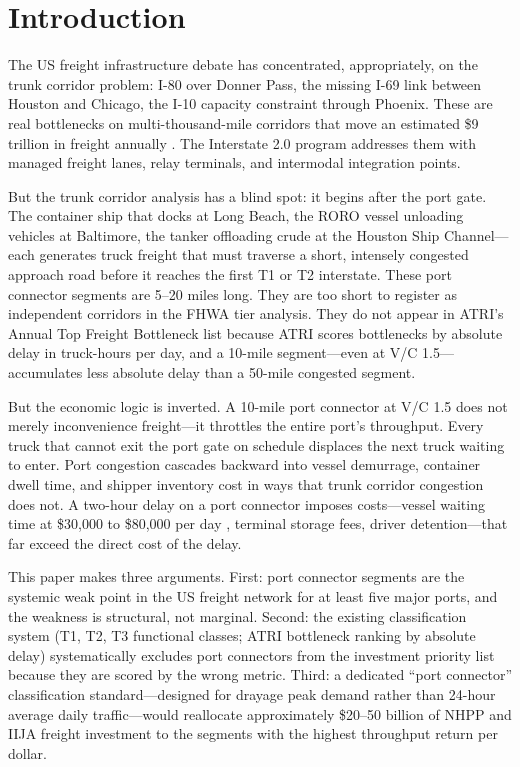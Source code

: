 \section{Introduction}
\label{sec:introduction}

The US freight infrastructure debate has concentrated, appropriately, on the trunk corridor problem: I-80 over Donner Pass, the missing I-69 link between Houston and Chicago, the I-10 capacity constraint through Phoenix. These are real bottlenecks on multi-thousand-mile corridors that move an estimated \$9 trillion in freight annually \citep{FAF5_2023}. The Interstate 2.0 program addresses them with managed freight lanes, relay terminals, and intermodal integration points.

But the trunk corridor analysis has a blind spot: it begins after the port gate. The container ship that docks at Long Beach, the RORO vessel unloading vehicles at Baltimore, the tanker offloading crude at the Houston Ship Channel---each generates truck freight that must traverse a short, intensely congested approach road before it reaches the first T1 or T2 interstate. These port connector segments are 5--20 miles long. They are too short to register as independent corridors in the FHWA tier analysis. They do not appear in ATRI's Annual Top Freight Bottleneck list because ATRI scores bottlenecks by absolute delay in truck-hours per day, and a 10-mile segment---even at V/C 1.5---accumulates less absolute delay than a 50-mile congested segment.

But the economic logic is inverted. A 10-mile port connector at V/C 1.5 does not merely inconvenience freight---it throttles the entire port's throughput. Every truck that cannot exit the port gate on schedule displaces the next truck waiting to enter. Port congestion cascades backward into vessel demurrage, container dwell time, and shipper inventory cost in ways that trunk corridor congestion does not. A two-hour delay on a port connector imposes costs---vessel waiting time at \$30,000 to \$80,000 per day \citep{BTS_airfreight2023}, terminal storage fees, driver detention---that far exceed the direct cost of the delay.

This paper makes three arguments. First: port connector segments are the systemic weak point in the US freight network for at least five major ports, and the weakness is structural, not marginal. Second: the existing classification system (T1, T2, T3 functional classes; ATRI bottleneck ranking by absolute delay) systematically excludes port connectors from the investment priority list because they are scored by the wrong metric. Third: a dedicated ``port connector'' classification standard---designed for drayage peak demand rather than 24-hour average daily traffic---would reallocate approximately \$20--50 billion of NHPP and IIJA freight investment to the segments with the highest throughput return per dollar.

